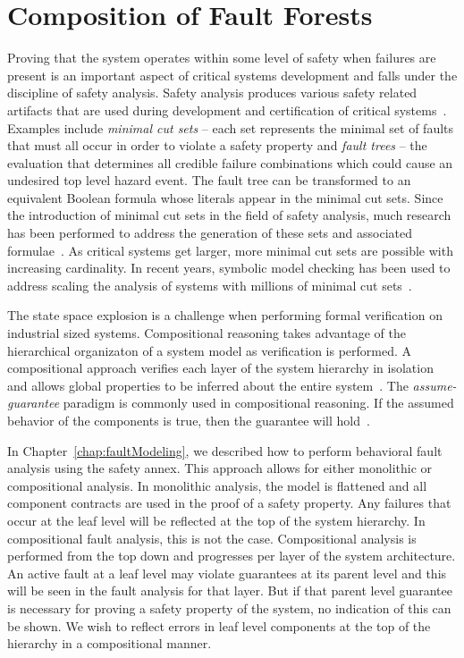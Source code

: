 \chapter{Composition of Fault Forests}
\label{chap:compFF}
Proving that the system operates within some level of safety when failures are present is an important aspect of critical systems development and falls under the discipline of safety analysis. Safety analysis produces various safety related artifacts that are used during development and certification of critical systems~\cite{SAE:ARP4754A}. Examples include {\em minimal cut sets} -- each set represents the minimal set of faults that must all occur in order to violate a safety property and {\em fault trees} -- the evaluation that determines all credible failure combinations which could cause an undesired top level hazard event. The fault tree can be transformed to an equivalent Boolean formula whose literals appear in the minimal cut sets. Since the introduction of minimal cut sets in the field of safety analysis, much research has been performed to address the generation of these sets and associated formulae~\cite{vesely1981fault,fta:survey,historyFTA}. As critical systems get larger, more minimal cut sets are possible with increasing cardinality. In recent years, symbolic model checking has been used to address scaling the analysis of systems with millions of minimal cut sets~\cite{bieber2002combination,schafer2003combining,symbFTA}. 

The state space explosion is a challenge when performing formal verification on industrial sized systems. Compositional reasoning takes advantage of the hierarchical organizaton of a system model as verification is performed. A compositional approach verifies each layer of the system hierarchy in isolation and allows global properties to be inferred about the entire system~\cite{berezin1997compositional}. The {\em assume-guarantee} paradigm is commonly used in compositional reasoning. If the assumed behavior of the components is true, then the guarantee will hold~\cite{cofer2012compositional}.

In Chapter~\ref{chap:faultModeling}, we described how to perform behavioral fault analysis using the safety annex. This approach allows for either monolithic or compositional analysis. In monolithic analysis, the model is flattened and all component contracts are used in the proof of a safety property. Any failures that occur at the leaf level will be reflected at the top of the system hierarchy. In compositional fault analysis, this is not the case. Compositional analysis is performed from the top down and progresses per layer of the system architecture. An active fault at a leaf level may violate guarantees at its parent level and this will be seen in the fault analysis for that layer. But if that parent level guarantee is necessary for proving a safety property of the system, no indication of this can be shown. We wish to reflect errors in leaf level components at the top of the hierarchy in a compositional manner. 

